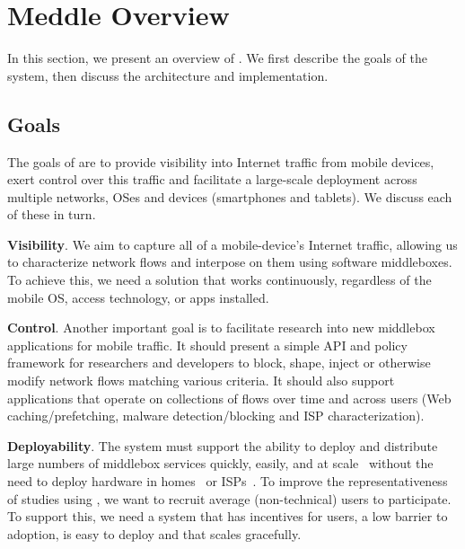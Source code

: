 \section{Meddle Overview}
\label{sec:goals}

In this section, we present an overview of \meddle. We first describe the goals of the 
system, then discuss the \meddle architecture and implementation. 


\subsection{Goals}

The goals of \meddle are to provide visibility into Internet traffic from mobile devices, 
exert control over this traffic and facilitate a large-scale deployment across multiple 
networks, OSes and devices (smartphones and tablets). We discuss each of these in turn.

\noindent\textbf{Visibility}. We aim to capture all of a mobile-device's Internet traffic,
allowing us to characterize network flows and interpose on them using software middleboxes. 
To achieve this, we need a solution that works continuously, regardless of the mobile OS, access 
technology, or apps installed. %
  
\noindent\textbf{Control}. Another important goal is to facilitate research into new middlebox 
applications for mobile traffic. 
It should present a simple API and policy framework for researchers and developers to block, shape, 
inject or otherwise modify network flows matching various criteria. It should also support applications that operate on collections of flows over 
time and across users (\eg Web caching/prefetching, malware detection/blocking and ISP characterization). 


\noindent\textbf{Deployability}. The system must support the ability to deploy and distribute large numbers 
of middlebox services quickly, easily, and at scale~\cite{sherry:middleboxes} without 
the need to deploy hardware in homes~\cite{bismark} or ISPs~\cite{wang:middleboxes}. 
To improve the representativeness of studies using \meddle, we want to 
recruit average (\ie non-technical) users to participate. To support this, we need a system 
that has incentives for users, a low barrier to adoption, is easy to deploy and that scales gracefully. 


